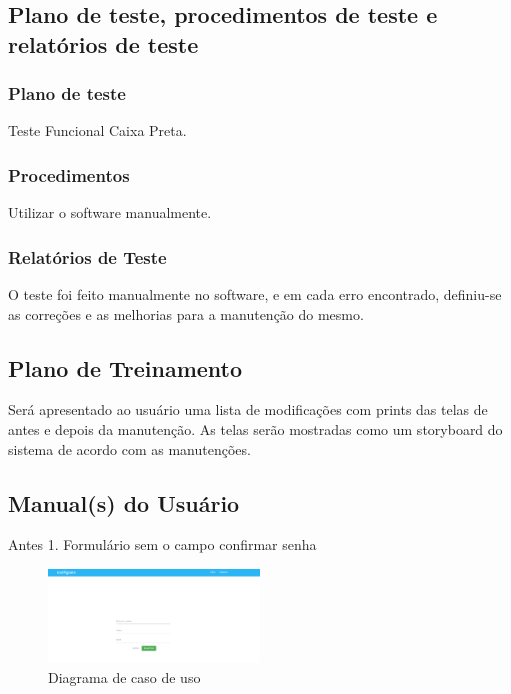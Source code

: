 \subsection{Plano de teste, procedimentos de teste e relatórios de teste}

\subsubsection{Plano de teste}

Teste Funcional Caixa Preta.

\subsubsection{Procedimentos}

Utilizar o software manualmente.

\subsubsection{Relatórios de Teste}
O teste foi feito manualmente no software, e em cada erro encontrado, definiu-se as correções e as melhorias para a manutenção do mesmo.

\subsection{Plano de Treinamento}

 Será apresentado ao usuário uma lista de modificações com prints das telas de antes e depois da manutenção. 
 As telas serão mostradas como um storyboard do sistema de acordo com as manutenções.

\subsection{Manual(s) do Usuário}
Antes
1. Formulário sem o campo confirmar senha
\begin{figure}[ht]
	\centering
	\includegraphics[width=0.5\textwidth]{./imagens/confirmacao_senha.png}
	\caption{Diagrama de caso de uso}
	\label{fig:casoDeUso}
\end{figure}

